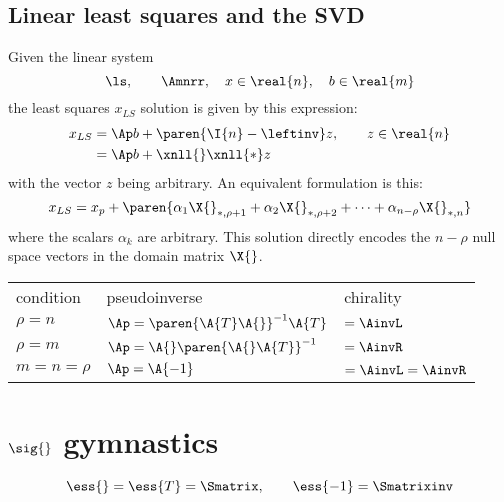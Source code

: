 \documentclass[10pt]{newsiambook}
\begin{document}
\subsection*{Linear least squares and the SVD}
Given the linear system
\begin{equation*}
  \ls, \qquad \Amnrr, \quad x \in \real{n}, \quad b\in\real{m}
\end{equation*}
the least squares $x_{LS}$ solution is given by this expression:
\begin{equation*}
  \begin{split}
    x_{LS} &= \Ap b + \paren{\I{n}-\leftinv}z, \qquad z\in\real{n} \\
    &= \Ap b + \xnll{}\xnll{*}z
  \end{split}
\end{equation*}
with the vector $z$ being arbitrary. An equivalent formulation is this:
\begin{equation*}
    x_{LS} = x_{p} + \paren{\alpha_{1} \X{}_{*,\rho+1} + \alpha_{2} \X{}_{*,\rho+2} + \dots + \alpha_{n-\rho} \X{}_{*,n}}
\end{equation*}
where the scalars $\alpha_{k}$ are arbitrary. This solution directly encodes the $n-\rho$ null space vectors in the domain matrix $\X{}$.

\begin{table}[htdp]
\begin{center}
\begin{tabular}{lll}
  condition & pseudoinverse & chirality \\
  $\rho = n$      & $\Ap = \paren{\A{T}\A{}}^{-1}\A{T}$ & $= \AinvL$ \\
  $\rho = m$      & $\Ap = \A{}\paren{\A{}\A{T}}^{-1}$ & $= \AinvR$ \\
  $m = n = \rho$  & $\Ap = \A{-1}$ & $= \AinvL= \AinvR $ \\
\end{tabular}
\end{center}
\label{default}
\end{table}%


\clearpage
\break

\section*{$\sig{}$ gymnastics}

\begin{equation*}
  \ess{} = \ess{T} = \Smatrix, \qquad \ess{-1} = \Smatrixinv
\end{equation*}
\end{document}
